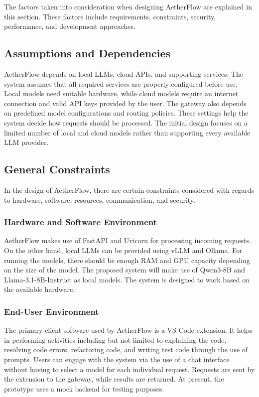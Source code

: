 \documentclass{FastFyp}
\begin{document}
The factors taken into consideration when designing AetherFlow are explained in this section. These factors include requirements, constraints, security, performance, and development approaches.

\subsection{Assumptions and Dependencies}

AetherFlow depends on local LLMs, cloud APIs, and supporting services. The system assumes that all required services are properly configured before use. Local models need suitable hardware, while cloud models require an internet connection and valid API keys provided by the user. The gateway also depends on predefined model configurations and routing policies. These settings help the system decide how requests should be processed. The initial design focuses on a limited number of local and cloud models rather than supporting every available LLM provider.

\subsection{General Constraints}

In the design of AetherFlow, there are certain constraints considered with regards to hardware, software, resources, communication, and security.

\subsubsection{Hardware and Software Environment}

AetherFlow makes use of FastAPI and Uvicorn for processing incoming requests. On the other hand, local LLMs can be provided using vLLM and Ollama. For running the models, there should be enough RAM and GPU capacity depending on the size of the model. The proposed system will make use of Qwen3-8B and Llama-3.1-8B-Instruct as local models. The system is designed to work based on the available hardware.

\subsubsection{End-User Environment}

The primary client software used by AetherFlow is a VS Code extension. It helps in performing activities including but not limited to explaining the code, resolving code errors, refactoring code, and writing test code through the use of prompts. Users can engage with the system via the use of a chat interface without having to select a model for each individual request. Requests are sent by the extension to the gateway, while results are returned. At present, the prototype uses a mock backend for testing purposes.
\end{document}
